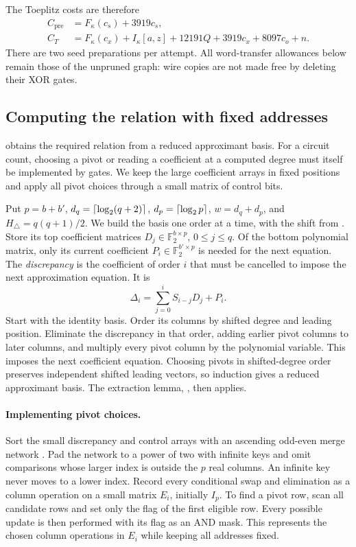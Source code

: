 \documentclass[b5paper, 10pt, abstract=true, captions=tableheading]{scrartcl}
\theoremstyle{plain}
\theoremstyle{definition}
\newcommand{\FF}{\mathds{F}}
\begin{document}
The Toeplitz costs are therefore
\begin{equation}
 \begin{split}
 C_{\mathrm{pre}}&=F_\kappa(c_s)+3919c_s,\\
 C_T&=F_\kappa(c_x)+I_\kappa[a,z]+12191Q
           +3919c_x+8097c_o+n .
 \end{split}
 \label{eq:wopt-toeplitzcost}
\end{equation}
There are two seed preparations per attempt. All word-transfer
allowances below remain those of the unpruned graph: wire copies are
not made free by deleting their XOR gates.

\subsection{Computing the relation with fixed addresses}
\label{sec:wopt-generator}
 obtains the required relation from a
reduced approximant basis.
For a circuit count, choosing a pivot or reading a coefficient at a
computed degree must itself be implemented by gates. We keep the large
coefficient arrays in fixed positions and apply all pivot choices through
a small matrix of control bits.

Put \(p=b+b'\), \(d_q=\left\lceil \log_2(q+2)\right\rceil\),
\(d_p=\left\lceil \log_2p\right\rceil\), \(w=d_q+d_p\), and
\(H_{\triangle}=q(q+1)/2\). We build the basis one order at a time, with the shift from
. Store its top coefficient matrices
$D_j\in\FF_2^{b\times p}$, $0\leq j\leq q$. Of the bottom polynomial
matrix, only its current coefficient $P_i\in\FF_2^{b'\times p}$ is needed
for the next equation.
The \emph{discrepancy} is the coefficient of order $i$ that must be
cancelled to impose the next approximation equation. It is
\[
 \Delta_i=\sum_{j=0}^i S_{i-j}D_j+P_i.
\]
Start with the identity basis. Order its columns by shifted degree and
leading position. Eliminate the discrepancy in that order, adding earlier
pivot columns to later columns, and multiply every pivot column by the
polynomial variable. This imposes the next coefficient equation. Choosing
pivots in shifted-degree order preserves independent shifted leading
vectors, so induction gives a reduced approximant basis. The extraction
lemma, , then applies.

\paragraph{Implementing pivot choices.}
Sort the small discrepancy and control arrays with an ascending odd-even merge network
\cite{Batcher1968}. Pad the network to a power of two with infinite keys
and omit comparisons whose larger index is outside the $p$ real columns.
An infinite key never moves to a lower index. Record every conditional
swap and elimination as a column operation on a small matrix $E_i$,
initially $I_p$. To find a pivot row, scan all candidate rows and set
only the flag of the first eligible row. Every possible update is then
performed with its flag as an AND mask. This represents the chosen column
operations in $E_i$ while keeping all addresses fixed.
\end{document}
